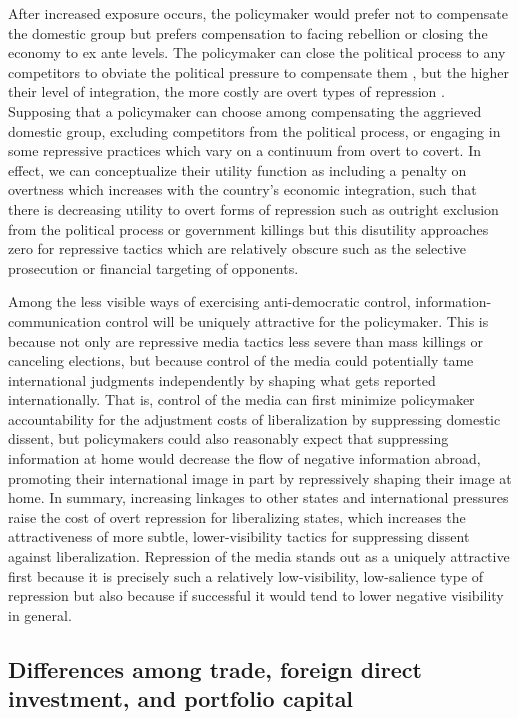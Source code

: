 \documentclass[a4paper]{article}\usepackage[]{graphicx}\usepackage[]{color}
\begin{document}
After increased exposure occurs, the policymaker would prefer not to compensate the domestic group but prefers compensation to facing rebellion or closing the economy to ex ante levels. The policymaker can close the political process to any competitors to obviate the political pressure to compensate them \parencite{Adsera:2002vt}, but the higher their level of integration, the more costly are overt types of repression \parencite{Levitsky:2002gx}. Supposing that a policymaker can choose among compensating the aggrieved domestic group, excluding competitors from the political process, or engaging in some repressive practices which vary on a continuum from overt to covert. In effect, we can conceptualize their utility function as including a penalty on overtness which increases with the country's economic integration, such that there is decreasing utility to overt forms of repression such as outright exclusion from the political process or government killings but this disutility approaches zero for repressive tactics which are relatively obscure such as the selective prosecution or financial targeting of opponents.

Among the less visible ways of exercising anti-democratic control, information-communication control will be uniquely attractive for the policymaker. This is because not only are repressive media tactics less severe than mass killings or canceling elections, but because control of the media could potentially tame international judgments independently by shaping what gets reported internationally. That is, control of the media can first minimize policymaker accountability for the adjustment costs of liberalization by suppressing domestic dissent, but policymakers could also reasonably expect that suppressing information at home would decrease the flow of negative information abroad, promoting their international image in part by repressively shaping their image at home. In summary, increasing linkages to other states and international pressures raise the cost of overt repression for liberalizing states, which increases the attractiveness of more subtle, lower-visibility tactics for suppressing dissent against liberalization. Repression of the media stands out as a uniquely attractive first because it is precisely such a relatively low-visibility, low-salience type of repression but also because if successful it would tend to lower negative visibility in general.

\subsection{Differences among trade, foreign direct investment, and portfolio capital}
\end{document}
